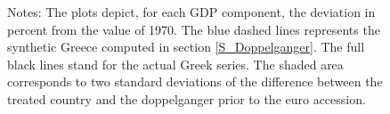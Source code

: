 \documentclass[12pt]{article}
\newcommand{\annote}[1]{\parbox{\textwidth}{\renewcommand{\baselinestretch}{1.0}\vspace{12pt} \small Notes: #1}}
\begin{document}
\begin{figure}[h!]
    \annote{The plots depict, for each GDP component, the deviation in percent from the value of 1970. The blue dashed lines represents the synthetic Greece computed in section \ref{S_Doppelganger}. The full black lines stand for the actual Greek series. The shaded area corresponds to two standard deviations of the difference between the treated country and the doppelganger prior to the euro accession. }
\end{figure}
\end{document}
